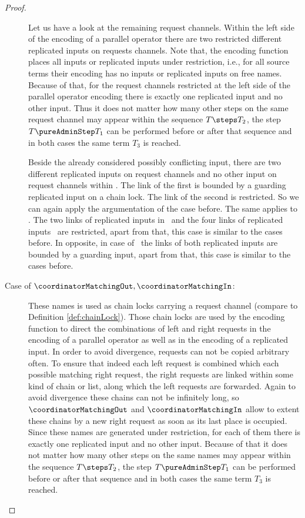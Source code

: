\documentclass[]{llncs}
\begin{document}
\begin{proof}
\begin{description}
			Let us have a look at the remaining request channels. Within the left side of the encoding of a parallel operator there are two restricted different replicated inputs on requests channels. Note that, the encoding function places all inputs or replicated inputs under restriction, i.e., for all source terms their encoding has no inputs or replicated inputs on free names. Because of that, for the request channels restricted at the left side of the parallel operator encoding there is exactly one replicated input and no other input. Thus it does not matter how many other steps on the same request channel may appear within the sequence $ T \steps T_2 $, the step $ T \pureAdminStep T_1 $ can be performed before or after that sequence and in both cases the same term $ T_3 $ is reached.
			
			Beside the already considered possibly conflicting input, there are two different replicated inputs on request channels and no other input on request channels within \processRightOutputRequests. The link of the first is bounded by a guarding replicated input on a chain lock. The link of the second is restricted. So we can again apply the argumentation of the case before. The same applies to \processRightInputRequests. The two links of replicated inputs in \pushRequests \ and the four links of replicated inputs \pushRequestsOut \ are restricted, apart from that, this case is similar to the cases before. In opposite, in case of \pushRequestsIn \ the links of both replicated inputs are bounded by a guarding input, apart from that, this case is similar to the cases before.
		\item[Case of $ \coordinatorMatchingOut, \coordinatorMatchingIn $:] These names is used as chain locks carrying a request channel (compare to Definition \ref{def:chainLock}). Those chain locks are used by the encoding function to direct the combinations of left and right requests in the encoding of a parallel operator as well as in the encoding of a replicated input. In order to avoid divergence, requests can not be copied arbitrary often. To ensure that indeed each left request is combined which each possible matching right request, the right requests are linked within some kind of chain or list, along which the left requests are forwarded. Again to avoid divergence these chains can not be infinitely long, so $ \coordinatorMatchingOut $ and $ \coordinatorMatchingIn $ allow to extent these chains by a new right request as soon as its last place is occupied. Since these names are generated under restriction, for each of them there is exactly one replicated input and no other input. Because of that it does not matter how many other steps on the same names may appear within the sequence $ T \steps T_2 $, the step $ T \pureAdminStep T_1 $ can be performed before or after that sequence and in both cases the same term $ T_3 $ is reached.

\end{description}
\end{proof}
\end{document}
